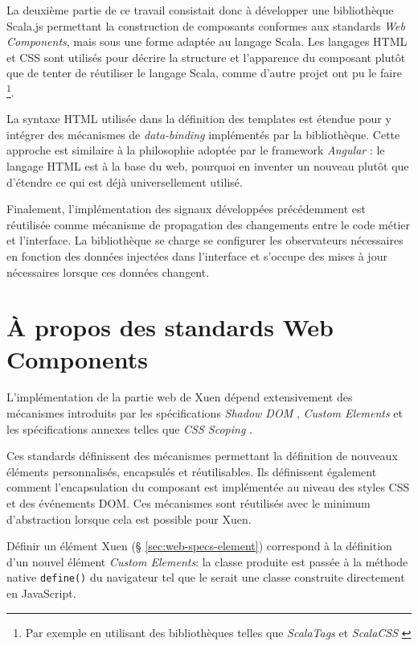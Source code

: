 La deuxième partie de ce travail consistait donc à développer une bibliothèque Scala.js permettant la construction de composants conformes aux standards \emph{Web Components}, mais sous une forme adaptée au langage Scala. Les langages HTML et CSS sont utilisés pour décrire la structure et l'apparence du composant plutôt que de tenter de réutiliser le langage Scala, comme d'autre projet ont pu le faire \footnote{Par exemple en utilisant des bibliothèques telles que \emph{ScalaTags} \cite{scalatags} et \emph{ScalaCSS} \cite{scalacss}}.

La syntaxe HTML utilisée dans la définition des templates est étendue pour y intégrer des mécanismes de \emph{data-binding} implémentés par la bibliothèque. Cette approche est similaire à la philosophie adoptée par le framework \emph{Angular} \cite{angular}: le langage HTML est à la base du web, pourquoi en inventer un nouveau plutôt que d'étendre ce qui est déjà universellement utilisé.

Finalement, l'implémentation des signaux développées précédemment est réutilisée comme mécanisme de propagation des changements entre le code métier et l'interface. La bibliothèque se charge se configurer les observateurs nécessaires en fonction des données injectées dans l'interface et s'occupe des mises à jour nécessaires lorsque ces données changent.

\section{À propos des standards Web Components}

L'implémentation de la partie web de Xuen dépend extensivement des mécanismes introduits par les spécifications \emph{Shadow DOM} \cite{w3c-shadowdom}, \emph{Custom Elements} \cite{w3c-custom-elements} et les spécifications annexes telles que \emph{CSS Scoping} \cite{w3c-css-scopings}.

Ces standards définissent des mécanismes permettant la définition de nouveaux éléments personnalisés, encapsulés et réutilisables. Ils définissent également comment l'encapsulation du composant est implémentée au niveau des styles CSS et des événements DOM. Ces mécanismes sont réutilisés avec le minimum d'abstraction lorsque cela est possible pour Xuen.

Définir un élément Xuen (§ \ref{sec:web-specs-element}) correspond à la définition d'un nouvel élément \emph{Custom Elements}: la classe produite est passée à la méthode native \texttt{define()} du navigateur tel que le serait une classe construite directement en JavaScript.

